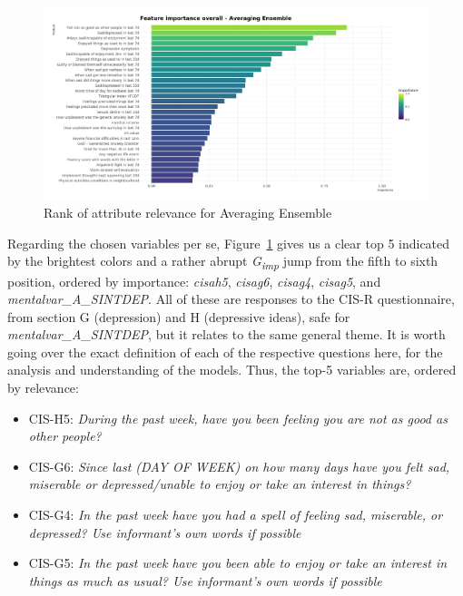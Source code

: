 \begin{figure}[H]
    \caption{Rank of attribute relevance for Averaging Ensemble}
    \centerline{\includegraphics[scale=.21]{../reports/results/models_and_evals/summary/var_imp_aggregation.png}}
    \label{fig:rank-ensemble}
\end{figure}

Regarding the chosen variables per se, Figure~\ref{fig:rank-ensemble} gives us a clear top 5 indicated by the brightest colors and a rather abrupt \textit{G\textsubscript{imp}} jump from the fifth to sixth position, ordered by importance: \textit{cisah5}, \textit{cisag6}, \textit{cisag4}, \textit{cisag5}, and \textit{mentalvar\_A\_SINTDEP}.
All of these are responses to the CIS-R questionnaire, from section G (depression) and H (depressive ideas), safe for \textit{mentalvar\_A\_SINTDEP}, but it relates to the same general theme.
It is worth going over the exact definition of each of the respective questions here, for the analysis and understanding of the models.
Thus, the top-5 variables are, ordered by relevance:

\begin{itemize}
    \item CIS-H5: \textit{During the past week, have you been feeling you are not as good as other people?}
    \item CIS-G6: \textit{Since last (DAY OF WEEK) on how many days have you felt sad, miserable or depressed/unable to enjoy or take an interest in things?}
    \item CIS-G4: \textit{In the past week have you had a spell of feeling sad, miserable, or depressed? Use informant's own words if possible}
    \item CIS-G5: \textit{In the past week have you been able to enjoy or take an interest in things as much as usual? Use informant's own words if possible}
\end{itemize}

